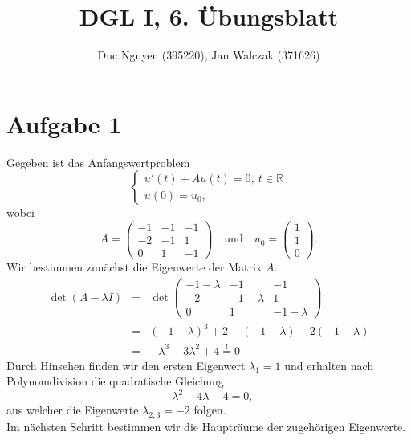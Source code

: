 \documentclass[10pt,a4paper]{article}
\title{DGL I, 6. Übungsblatt}
\author{Duc Nguyen (395220), Jan Walczak (371626)}
\date{}
\begin{document}
\maketitle

\section*{Aufgabe 1}
Gegeben ist das Anfangswertproblem
\begin{equation*}
	\begin{cases}
		u'(t) + Au(t) = 0, \ t\in\mathbb{R}\\
		u(0) = u_0,
	\end{cases}
\end{equation*}
wobei
\begin{equation*}
	A = \begin{pmatrix}
		-1 & -1 & -1\\
		-2 & -1 & 1\\
		0 & 1 & -1
	\end{pmatrix}
	\quad \text{und} \quad
	u_0 = \begin{pmatrix}
	1\\1\\0
	\end{pmatrix}.
\end{equation*}
Wir bestimmen zunächst die Eigenwerte der Matrix $A$.
\begin{eqnarray*}
	\det(A-\lambda I) &=& \det\begin{pmatrix}
		-1-\lambda & -1 & -1\\
		-2 & -1-\lambda & 1\\
		0 & 1 & -1-\lambda
	\end{pmatrix}\\
	&=& (-1-\lambda)^3 +2-(-1-\lambda) - 2(-1-\lambda)\\
	&=& -\lambda^3 -3\lambda^2 +4 \stackrel{!}{=} 0
\end{eqnarray*}
Durch Hinsehen finden wir den ersten Eigenwert $\lambda_1 = 1$ und erhalten nach Polynomdivision die quadratische Gleichung
\begin{equation*}
	-\lambda^2-4\lambda-4 = 0,
\end{equation*}
aus welcher die Eigenwerte $\lambda_{2,3} = -2$ folgen.\\
Im nächsten Schritt bestimmen wir die Haupträume der zugehörigen Eigenwerte.
\end{document}

